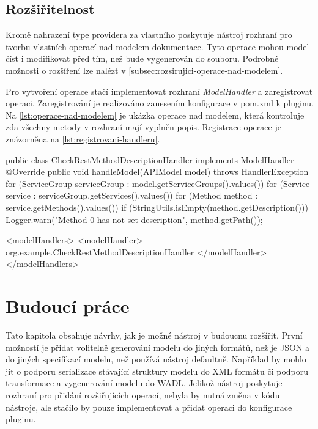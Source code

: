 \documentclass[11pt,twoside,a4paper]{book}
\begin{document}
\section{Rozšiřitelnost}

Kromě nahrazení type providera za vlastního poskytuje nástroj rozhraní pro
tvorbu vlastních operací nad modelem dokumentace. Tyto operace mohou model číst
i modifikovat před tím, než bude vygenerován do souboru. Podrobné možnosti o
rozšíření lze nalézt v \ref{subsec:rozsirujici-operace-nad-modelem}.

Pro vytvoření operace stačí implementovat rozhraní {\em ModelHandler} a
zaregistrovat operaci. Zaregistrování je realizováno zanesením konfigurace v
pom.xml k pluginu. Na \ref{lst:operace-nad-modelem} je ukázka operace nad modelem, která
kontroluje zda všechny metody v rozhraní mají vyplněn popis. Registrace operace
je znázorněna na \ref{lst:registrovani-handleru}.

\begin{code}[frame=single, caption={Ukázka použití operace nad modelem},
basicstyle=\small, label={lst:operace-nad-modelem}] 
public class CheckRestMethodDescriptionHandler implements ModelHandler {
  @Override
  public void handleModel(APIModel model) throws HandlerException {
    for (ServiceGroup serviceGroup : model.getServiceGroups().values()) {
      for (Service service : serviceGroup.getServices().values()) {
        for (Method method : service.getMethods().values()) {
          if (StringUtils.isEmpty(method.getDescription())) {
            Logger.warn("Method {0} has not set description",
              method.getPath());
          }
        }
      }
    }
  }
}
\end{code}

\begin{code}[frame=single, caption={Registrování handleru pro model},
label={lst:registrovani-handleru}] 
<modelHandlers>
    <modelHandler>
        org.example.CheckRestMethodDescriptionHandler
    </modelHandler>
</modelHandlers>
\end{code}

\chapter{Budoucí práce}

Tato kapitola obsahuje návrhy, jak je možné nástroj v budoucnu rozšířit.
První možností je přidat volitelně generování modelu do jiných
formátů, než je JSON a do jiných specifikací modelu, než používá nástroj
defaultně. Například by mohlo jít o podporu serializace stávající struktury
modelu do XML formátu či podporu transformace a vygenerování modelu do WADL.
Jelikož nástroj poskytuje rozhraní pro přidání rozšiřujících operací, nebyla by
nutná změna v kódu nástroje, ale stačilo by pouze implementovat a přidat operaci do konfigurace pluginu.
\end{document}

